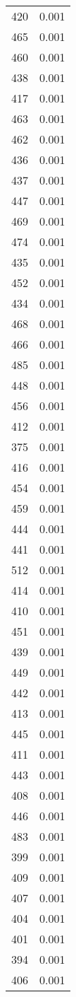 \begin{table}
\begin{tabular}{lr}
420 & 0.001 \\
465 & 0.001 \\
460 & 0.001 \\
438 & 0.001 \\
417 & 0.001 \\
463 & 0.001 \\
462 & 0.001 \\
436 & 0.001 \\
437 & 0.001 \\
447 & 0.001 \\
469 & 0.001 \\
474 & 0.001 \\
435 & 0.001 \\
452 & 0.001 \\
434 & 0.001 \\
468 & 0.001 \\
466 & 0.001 \\
485 & 0.001 \\
448 & 0.001 \\
456 & 0.001 \\
412 & 0.001 \\
375 & 0.001 \\
416 & 0.001 \\
454 & 0.001 \\
459 & 0.001 \\
444 & 0.001 \\
441 & 0.001 \\
512 & 0.001 \\
414 & 0.001 \\
410 & 0.001 \\
451 & 0.001 \\
439 & 0.001 \\
449 & 0.001 \\
442 & 0.001 \\
413 & 0.001 \\
445 & 0.001 \\
411 & 0.001 \\
443 & 0.001 \\
408 & 0.001 \\
446 & 0.001 \\
483 & 0.001 \\
399 & 0.001 \\
409 & 0.001 \\
407 & 0.001 \\
404 & 0.001 \\
401 & 0.001 \\
394 & 0.001 \\
406 & 0.001 \\

\end{tabular}
\end{table}
